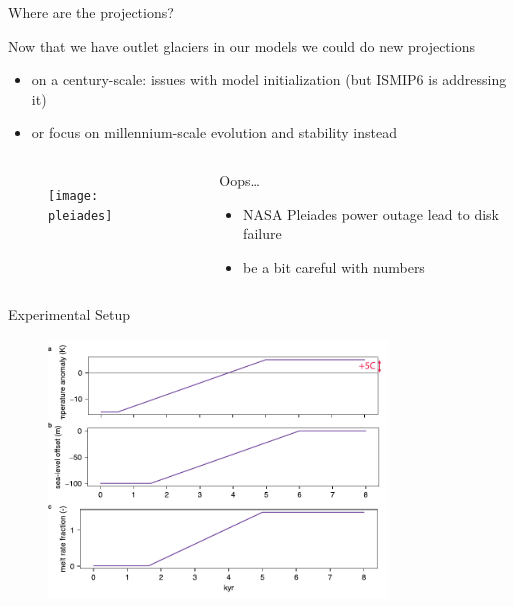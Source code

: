 \documentclass[hide notes,intlimits]{beamer}
\begin{document}
\begin{frame}{Where are the projections?}
  \begin{block}{Now that we have outlet glaciers in our models}
    we could do new projections
    \begin{itemize}
    \item on a century-scale: issues with model initialization (but ISMIP6 is addressing it)
    \item or \alert{focus on millennium-scale evolution and stability instead}
    \end{itemize}
  \end{block}
  \begin{columns}
    \column[T]{5cm}
    \begin{figure}
      \texttt{[image: pleiades]}
    \end{figure}
    \column[T]{5cm}
    \begin{block}{Oops\ldots}
      \begin{itemize}
      \item NASA Pleiades power outage lead to disk failure
      \item be a bit careful with numbers
      \end{itemize}
    \end{block}
  \end{columns}
\end{frame}

{
%
} 


\begin{frame}{Experimental Setup}
  \vspace{1em}
  \begin{figure}
    \includegraphics[width=9cm]{glacial_forcing_ts}
  \end{figure}
\end{frame}
\end{document}
